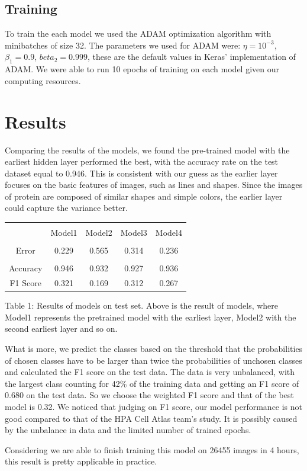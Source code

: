 \documentclass{article}
\begin{document}
\subsection{Training}
To train the each model we used the ADAM optimization algorithm with minibatches of size 32.
The parameters we used for ADAM were: $\eta = 10^{-3}$, $\beta_1 = 0.9$, $beta_2=0.999$, these
are the default values in Keras' implementation of ADAM.
We were able to run 10 epochs of training on each model given our computing resources. 
\section{Results}
Comparing the results of the models, we found the pre-trained model with the earliest hidden layer performed the best, with the accuracy rate on the test dataset equal to 0.946. This is consistent with our guess as the earlier layer focuses on the basic features of images, such as lines and shapes. Since the images of protein are composed of similar shapes and simple colors, the earlier layer could capture the variance better. 

\begin{table}[h!]
\centering

\begin{tabular}{|c|c|c|c|c|}
    \hline\\
     &Model1 & Model2&Model3&Model4 \\
     \hline\\
     Error&0.229&0.565&0.314&0.236\\
     \hline\\
     Accuracy&0.946&0.932&0.927&0.936\\
      \hline
     F1 Score&0.321&0.169&0.312&0.267\\
     \hline
\end{tabular}

{\raggedright Table 1: Results of models on test set. Above is the result of models, where Model1 represents the pretrained model with the earliest layer, Model2 with the second earliest layer and so on. \par}

\label{table:1}
\end{table}

What is more, we predict the classes based on the threshold that the probabilities of chosen classes have to be larger than twice the probabilities of unchosen classes and calculated the F1 score on the test data. The data is very unbalanced, with the largest class counting for 42\% of the training data and getting an F1 score of 0.680 on the test data. So we choose the weighted F1 score and that of the best model is 0.32. We noticed that judging on F1 score, our model performance is not good compared to that of the HPA Cell Atlas team's study. It is possibly caused by the unbalance in data and the limited number of trained epochs.

Considering we are able to finish training this model on 26455 images in 4 hours, this result is pretty applicable in practice.
\end{document}
